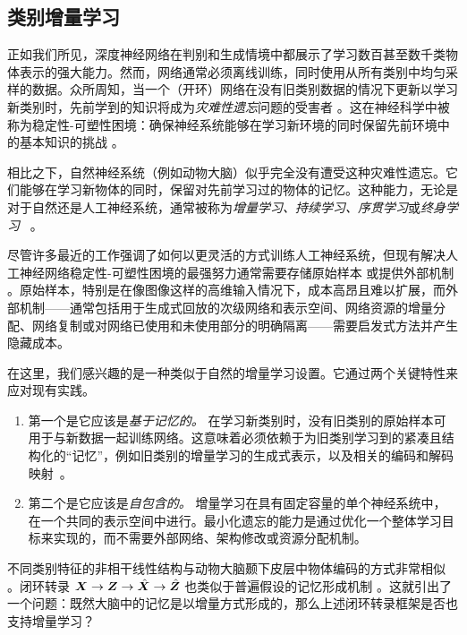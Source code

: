 \documentclass[../../book-main_zh.tex]{subfiles}
\begin{document}
\subsection{类别增量学习}
\label{sec:class-wise-incremental}

正如我们所见，深度神经网络在判别和生成情境中都展示了学习数百甚至数千类物体表示的强大能力。然而，网络通常必须离线训练，同时使用从所有类别中均匀采样的数据。众所周知，当一个（开环）网络在没有旧类别数据的情况下更新以学习新类别时，先前学到的知识将成为{\em 灾难性遗忘}问题的受害者 \cite{McCloskey1989catastrophic}。这在神经科学中被称为稳定性-可塑性困境：确保神经系统能够在学习新环境的同时保留先前环境中的基本知识的挑战 \cite{Grossberg1987CompetitiveLF}。

相比之下，自然神经系统（例如动物大脑）似乎完全没有遭受这种灾难性遗忘。它们能够在学习新物体的同时，保留对先前学习过的物体的记忆。这种能力，无论是对于自然还是人工神经系统，通常被称为{\em 增量学习、持续学习、序贯学习}或{\em 终身学习}~ \cite{controlled-forgetting}。



尽管许多最近的工作强调了如何以更灵活的方式训练人工神经系统，但现有解决人工神经网络稳定性-可塑性困境的最强努力通常需要存储原始样本 \cite{icarl,chaudhry2019tiny} 或提供外部机制 \cite{EWC}。原始样本，特别是在像图像这样的高维输入情况下，成本高昂且难以扩展，而外部机制——通常包括用于生成式回放的次级网络和表示空间、网络资源的增量分配、网络复制或对网络已使用和未使用部分的明确隔离——需要启发式方法并产生隐藏成本。


在这里，我们感兴趣的是一种类似于自然的增量学习设置。它通过两个关键特性来应对现有实践。
\begin{enumerate}
    \item 第一个是它应该是\emph{基于记忆的。} 在学习新类别时，没有旧类别的原始样本可用于与新数据一起训练网络。这意味着必须依赖于为旧类别学习到的紧凑且结构化的“记忆”，例如旧类别的增量学习的生成式表示，以及相关的编码和解码映射~\cite{fearnet}。
    \item 第二个是它应该是\emph{自包含的。} 增量学习在具有固定容量的单个神经系统中，在一个共同的表示空间中进行。最小化遗忘的能力是通过优化一个整体学习目标来实现的，而不需要外部网络、架构修改或资源分配机制。
\end{enumerate}

不同类别特征的非相干线性结构与动物大脑颞下皮层中物体编码的方式非常相似 \cite{Chang-Cell-2017,Bao2020AMO}。闭环转录 $\bm{X} \rightarrow \bm{Z} \rightarrow \hat{\bm{X}} \rightarrow \hat{\bm{Z}}$ 也类似于普遍假设的记忆形成机制 \cite{2020Vandeven,Josselyn2020MemoryER}。这就引出了一个问题：既然大脑中的记忆是以增量方式形成的，那么上述闭环转录框架是否也支持增量学习？
\end{document}
